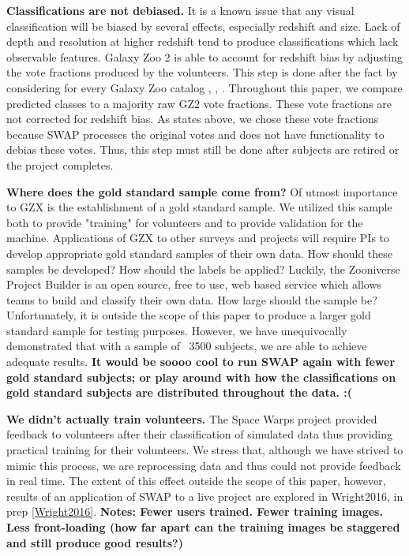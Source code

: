 \documentclass[twocolumn]{aastex6}
\begin{document}
\textbf{Classifications are not debiased.}  
It is a known issue that any visual 
classification will be biased by several effects, especially redshift and size. 
Lack of depth and resolution at higher redshift tend to produce classifications 
which lack observable features. Galaxy Zoo 2 is able to account for redshift bias
by adjusting the vote fractions produced by the volunteers. This step is done after
the fact by considering for every Galaxy Zoo catalog
 \cite{Willett2013}, \cite{Willett2016}, \cite{Simmons2016}. 
Throughout this paper, we compare predicted classes to a majority raw GZ2 vote fractions.
These vote fractions are not corrected for redshift bias. As states above, we chose
these vote fractions because SWAP processes the original votes and does not 
have functionality to debias these votes. Thus, this step must still be done 
after subjects are retired or the project completes. 


\textbf{Where does the gold standard sample come from?}
Of utmost importance to GZX is the establishment of a gold standard sample. 
We utilized this sample both to provide "training" for volunteers and to provide 
validation for the machine. Applications of GZX to other surveys and projects will
require PIs to develop appropriate gold standard samples of their own data. 
How should these samples be developed?
How should the labels be applied? Luckily, the Zooniverse Project Builder is an 
open source, free to use, web based service which allows teams to build and classify
their own data.
 How large should the sample be?  Unfortunately, it is outside the scope of this paper
to produce a larger gold standard sample for testing purposes. However, we have 
unequivocally demonstrated that with a sample of ~3500 subjects, we are able to 
achieve adequate results. 
\textbf{It would be soooo cool to run SWAP again with fewer gold standard subjects; 
or play around with how the classifications on gold standard subjects are distributed throughout the data. :(}


\textbf{We didn't actually train volunteers.}
The Space Warps project provided feedback to volunteers after their classification
of simulated data thus providing practical training for their volunteers. We stress 
that, although we have strived to mimic this process, we are reprocessing data and
thus could not provide feedback in real time. The extent of this effect outside the scope
of this paper, however, results of an application of SWAP to a live project 
are explored in Wright2016, in prep \ref{Wright2016}. 
\textbf{Notes: Fewer users trained. Fewer training images. 
Less front-loading (how far apart can the training images be staggered and still produce good results?)}
\end{document}
